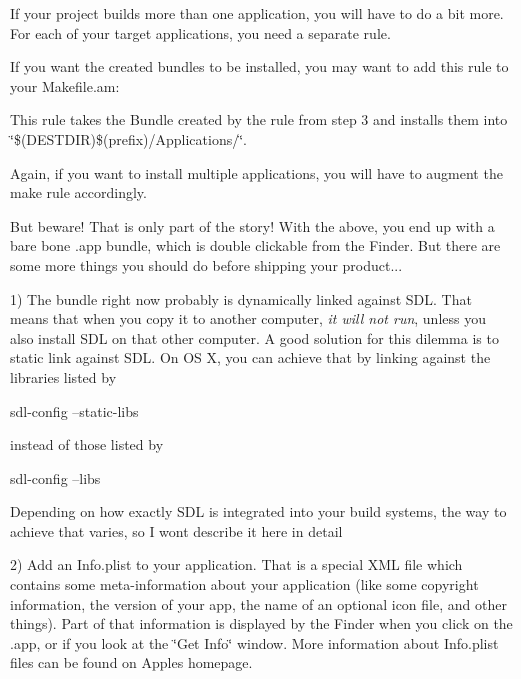 If your project builds more than one application, you will have to do a bit more. For each of your target applications, you need a separate rule.

If you want the created bundles to be installed, you may want to add this rule to your Makefile.\+am\+: 


This rule takes the Bundle created by the rule from step 3 and installs them into \char`\"{}\$(\+D\+E\+S\+T\+D\+I\+R)\$(prefix)/\+Applications/\char`\"{}.

Again, if you want to install multiple applications, you will have to augment the make rule accordingly.

But beware! That is only part of the story! With the above, you end up with a bare bone .app bundle, which is double clickable from the Finder. But there are some more things you should do before shipping your product...

1) The bundle right now probably is dynamically linked against S\+DL. That means that when you copy it to another computer, {\itshape it will not run}, unless you also install S\+DL on that other computer. A good solution for this dilemma is to static link against S\+DL. On OS X, you can achieve that by linking against the libraries listed by \begin{DoxyVerb}sdl-config --static-libs
\end{DoxyVerb}


instead of those listed by \begin{DoxyVerb}sdl-config --libs
\end{DoxyVerb}


Depending on how exactly S\+DL is integrated into your build systems, the way to achieve that varies, so I won\textquotesingle{}t describe it here in detail

2) Add an \textquotesingle{}Info.\+plist\textquotesingle{} to your application. That is a special X\+ML file which contains some meta-\/information about your application (like some copyright information, the version of your app, the name of an optional icon file, and other things). Part of that information is displayed by the Finder when you click on the .app, or if you look at the \char`\"{}\+Get Info\char`\"{} window. More information about Info.\+plist files can be found on Apple\textquotesingle{}s homepage.


